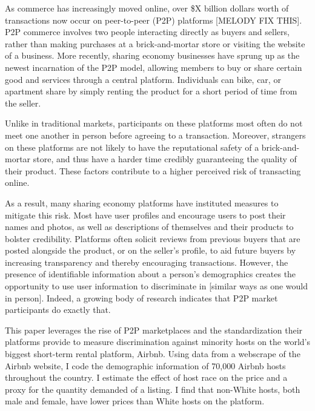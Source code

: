 


As commerce has increasingly moved online, over \$X billion dollars worth of transactions now occur on peer-to-peer (P2P) platforms [MELODY FIX THIS]. P2P commerce involves two people interacting directly as buyers and sellers, rather than making purchases at a brick-and-mortar store or visiting the website of a business. More recently, sharing economy businesses have sprung up as the newest incarnation of the P2P model, allowing members to buy or share certain good and services through a central platform. Individuals can bike, car, or apartment share by simply renting the product for a short period of time from the seller. 

Unlike in traditional markets, participants on these platforms most often do not meet one another in person before agreeing to a transaction. Moreover, strangers on these platforms are not likely to have the reputational safety of a brick-and-mortar store, and thus have a harder time credibly guaranteeing the quality of their product. These factors contribute to a higher perceived risk of transacting online. 

As a result, many sharing economy platforms have instituted measures to mitigate this risk. Most have user profiles and encourage users to post their names and photos, as well as descriptions of themselves and their products to bolster credibility. Platforms often solicit reviews from previous buyers that are posted alongside the product, or on the seller's profile, to aid future buyers by increasing transparency and thereby encouraging transactions. However, the presence of identifiable information about a person’s demographics creates the opportunity to use user information to discriminate in [similar ways as one would in person]. Indeed, a growing body of research indicates that P2P market participants do exactly that. 


This paper leverages the rise of P2P marketplaces and the standardization their platforms provide to measure discrimination against minority hosts on the world's biggest short-term rental platform, Airbnb. Using data from a webscrape of the Airbnb website, I code the demographic information of 70,000 Airbnb hosts throughout the country. I estimate the effect of host race on the price and a proxy for the quantity demanded of a listing. I find that non-White hosts, both male and female, have lower prices than White hosts on the platform. 

